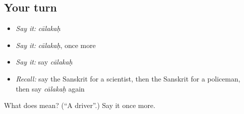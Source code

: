 \subsection*{Your turn}
\begin{itemize}
\raggedright
  \item \emph{Say it:} \emph{cālakaḥ}
  \item \emph{Say it:} \emph{cālakaḥ}, once more
  \item \emph{Say it:} say \emph{cālakaḥ}
  \item \emph{Recall:} say the Sanskrit for a scientist, then the Sanskrit for a policeman, then say \emph{cālakaḥ} again
\end{itemize}

\begin{tcolorbox}[breakable,colback=teal!4,colframe=teal!35!black,title={Before you move on}]
What does  mean? (\textquotedblleft{}A driver\textquotedblright{}.) Say it once more.
\end{tcolorbox}
